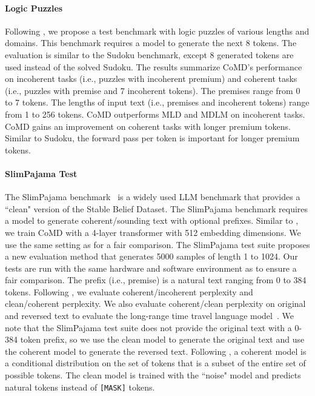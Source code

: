 \documentclass{article} %
\begin{document}
\paragraph{Logic Puzzles}
Following \citet{kitouni2024factorization}, we propose a test benchmark with logic puzzles of various lengths and domains. This benchmark requires a model to generate the next 8 tokens. The evaluation is similar to the Sudoku benchmark, except 8 generated tokens are used instead of the solved Sudoku. The results  summarize CoMD's performance on incoherent tasks (i.e., puzzles with incoherent premium) and coherent tasks (i.e., puzzles with premise and 7 incoherent tokens). The premises range from 0 to 7 tokens. The lengths of input text (i.e., premises and incoherent tokens) range from 1 to 256 tokens. CoMD outperforms MLD and MDLM on incoherent tasks. CoMD gains an improvement on coherent tasks with longer premium tokens. Similar to Sudoku, the forward pass per token is important for longer premium tokens. 


\paragraph{SlimPajama Test}
The SlimPajama benchmark~\citep{soboleva2023slimpajama} is a widely used LLM benchmark that provides a ``clean" version of the Stable Belief Dataset. The SlimPajama benchmark requires a model to generate coherent/sounding text with optional prefixes. Similar to \citet{nie2024scaling}, we train CoMD with a 4-layer transformer with 512 embedding dimensions. We use the same setting as \citet{nie2024scaling} for a fair comparison. The SlimPajama test suite proposes a new evaluation method that generates 5000 samples of length 1 to 1024. Our tests are run with the same hardware and software environment as \citet{nie2024scaling} to ensure a fair comparison. The prefix (i.e., premise) is a natural text ranging from 0 to 384 tokens. Following \citet{nie2024scaling}, we evaluate coherent/incoherent perplexity and clean/coherent perplexity. We also evaluate coherent/clean perplexity on original and reversed text to evaluate the long-range time travel language model~\citep{papadopoulos2024arrows,liu2022statistical}. We note that the SlimPajama test suite does not provide the original text with a 0-384 token prefix, so we use the clean model to generate the original text and use the coherent model to generate the reversed text. 
Following \citet{nie2024scaling}, a coherent model is a conditional distribution on the set of tokens that is a subset of the entire set of possible tokens. 
The clean model is trained with the ``noise" model and predicts natural tokens instead of \texttt{[MASK]} tokens. 
\end{document}
